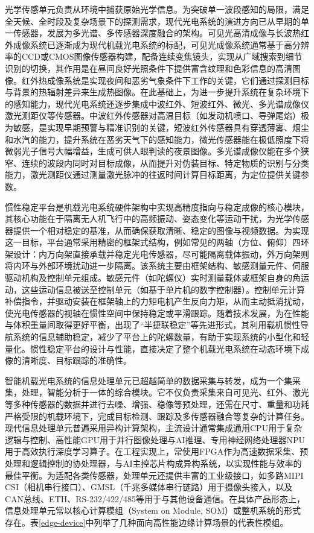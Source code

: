 光学传感单元负责从环境中捕获原始光学信息。为突破单一波段感知的局限，满足全天候、全时段及复杂场景下的探测需求，现代光电系统的演进方向已从早期的单一传感器，发展为多光谱、多传感器深度融合的架构。可见光高清成像与长波热红外成像系统已逐渐成为现代机载光电系统的标配，可见光成像系统通常基于高分辨率的CCD或CMOS图像传感器构建，配备连续变焦镜头，实现从广域搜索到细节识别的切换，其作用是在昼间良好光照条件下提供富含纹理和色彩信息的高清图像。红外热成像系统是实现夜间和恶劣气象条件下工作的关键，它们通过探测目标与背景的热辐射差异来生成热图像。在此基础上，为进一步提升系统在复杂环境下的感知能力，现代光电系统还逐步集成中波红外、短波红外、微光、多光谱成像仪激光测距仪等传感器\cite{HKKX202207001}。中波红外传感器对高温目标（如发动机喷口、导弹尾焰）极为敏感，是实现早期预警与精准识别的关键，短波红外传感器具有穿透薄雾、烟尘和水汽的能力，提升系统在恶劣天气下的感知能力，微光传感器能在极低照度下将微弱光子信号大幅增益，生成可供人眼判读的夜景图像。多光谱成像仪能在多个狭窄、连续的波段内同时对目标成像，从而提升对伪装目标、特定物质的识别与分类能力，激光测距仪通过测量激光脉冲的往返时间计算目标距离，为定位提供关键参数。

惯性稳定平台是机载光电系统硬件架构中实现高精度指向与稳定成像的核心模块，其核心功能在于隔离无人机飞行中的高频振动、姿态变化等运动干扰，为光学传感器提供一个相对稳定的基准，从而确保获取清晰、稳定的图像与视频数据。为实现这一目标，平台通常采用精密的框架式结构，例如常见的两轴（方位、俯仰）四环架设计：内万向架直接承载并稳定光电传感器，尽可能隔离载体振动，外万向架则将内环与外部环境扰动进一步隔离。该系统主要由框架结构、敏感测量元件、伺服驱动机构及控制单元组成。敏感元件（如陀螺仪）实时测量载体或框架自身的角运动，这些运动信息被送至控制单元（如基于单片机的数字控制器）。控制单元计算补偿指令，并驱动安装在框架轴上的力矩电机产生反向力矩，从而主动抵消扰动，使光电传感器的视轴在惯性空间中保持稳定或平滑跟踪。随着技术发展，为在性能与体积重量间取得更好平衡，出现了“半捷联稳定”等先进形式，其利用载机惯性导航系统的信息辅助稳定，减少了平台上的陀螺数量，有助于实现系统的小型化和轻量化。惯性稳定平台的设计与性能，直接决定了整个机载光电系统在动态环境下成像的清晰度、目标跟踪的准确性。

智能机载光电系统的信息处理单元已超越简单的数据采集与转发，成为一个集采集，处理，智能分析于一体的综合模块。它不仅负责采集来自可见光、红外、激光等多种传感器的数据并进行去噪、增强、稳像等预处理，还需在尺寸、重量和功耗严格受限的机载环境下，完成目标检测、跟踪及多传感器融合等复杂的计算任务。现代信息处理单元普遍采用异构计算架构，主流设计通常集成通用CPU用于复杂逻辑与控制、高性能GPU用于并行图像处理与AI推理、专用神经网络处理器NPU用于高效执行深度学习算子。在工程实现上，常使用FPGA作为高速数据采集、预处理和逻辑控制的协处理器，与AI主控芯片构成异构系统，以实现性能与效率的最佳平衡。为适配各类传感器，处理单元还提供丰富的工业级接口，如多路MIPI CSI（相机串行接口）、GMSL（千兆多媒体串行链路）用于摄像头接入，以及CAN总线、ETH、RS-232/422/485等用于与其他设备通信。在具体产品形态上，信息处理单元常以核心计算模组（System on Module, SOM）或整机系统的形式存在。表\ref{edge-device}中列举了几种面向高性能边缘计算场景的代表性模组。

